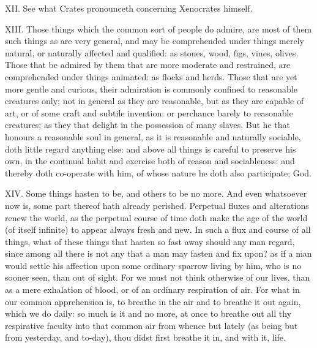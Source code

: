 XII. See what Crates pronounceth concerning Xenocrates himself.

XIII. Those things which the common sort of people do admire, are most
of them such things as are very general, and may be comprehended under
things merely natural, or naturally affected and qualified: as stones,
wood, figs, vines, olives. Those that be admired by them that are more
moderate and restrained, are comprehended under things animated: as flocks
and herds. Those that are yet more gentle and curious, their admiration is
commonly confined to reasonable creatures only; not in general as they are
reasonable, but as they are capable of art, or of some craft and subtile
invention: or perchance barely to reasonable creatures; as they that
delight in the possession of many slaves. But he that honours a reasonable
soul in general, as it is reasonable and naturally sociable, doth little
regard anything else: and above all things is careful to preserve his own,
in the continual habit and exercise both of reason and sociableness: and
thereby doth co-operate with him, of whose nature he doth also
participate; God.

XIV. Some things hasten to be, and others to be no more. And even
whatsoever now is, some part thereof hath already perished. Perpetual
fluxes and alterations renew the world, as the perpetual course of time
doth make the age of the world (of itself infinite) to appear always fresh
and new. In such a flux and course of all things, what of these things
that hasten so fast away should any man regard, since among all there is
not any that a man may fasten and fix upon? as if a man would settle his
affection upon some ordinary sparrow living by him, who is no sooner seen,
than out of sight. For we must not think otherwise of our lives, than as a
mere exhalation of blood, or of an ordinary respiration of air. For what
in our common apprehension is, to breathe in the air and to breathe it out
again, which we do daily: so much is it and no more, at once to breathe
out all thy respirative faculty into that common air from whence but
lately (as being but from yesterday, and to-day), thou didst first breathe
it in, and with it, life.

